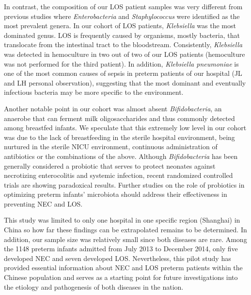 \documentclass[fleqn,10pt, lineno]{wlpeerj} %
\begin{document}
In contrast, the composition of our LOS patient samples was very different from previous studies where \textit{Enterobacteria} and \textit{Staphylococcus}  were identified as the most prevalent genera\citep{Stewart2017Longitudinal, mai2013distortions}. In our cohort of LOS patients, \textit{Klebsiella} was the most dominated genus.  LOS is frequently caused by organisms, mostly bacteria, that translocate from the intestinal tract to the bloodstream.  Consistently, \textit{Klebsiella} was detected in hemoculture in two out of two of our LOS patients (hemoculture was not performed for the third patient). In addition, \textit{Klebsiella pneumoniae} is one of the most common causes of sepsis in preterm patients of our hospital (JL and LH personal observation), suggesting that the most dominant and eventually infectious bacteria may be more specific to the environment.

Another notable point in our cohort was almost absent \textit{Bifidobacteria}, an anaerobe that can ferment milk oligosaccharides\citep{gomez2016human} and thus commonly detected among breastfed infants\citep{murphy2017composition}. We speculate that this extremely low level in our cohort was due to the lack of breastfeeding in the sterile hospital environment, being nurtured in the sterile NICU environment, continuous administration of antibiotics or the combinations of the above. Although \textit{Bifidobacteria} has been generally considered a probiotic that serves to protect neonates against necrotizing enterocolitis and systemic infection\citep{nakayama2003intestinal, khodayar2014impact, hermansson2019breast}, recent randomized controlled trials are showing paradoxical results\citep{hays2016probiotics, singh2019probiotics}. Further studies on the role of probiotics in optimizing preterm infants’ microbiota should address their effectiveness in preventing NEC and LOS.

This study was limited to only one hospital in one specific region (Shanghai)  in China so how far these findings can be extrapolated remains to be determined. In addition, our sample size was relatively small since both diseases are rare\citep{neu2011necrotizing, cohen2009early}. Among the 1148 preterm infants admitted from July 2013 to December 2014, only five developed NEC and seven developed LOS. Nevertheless, this pilot study has provided essential information about NEC and LOS preterm patients within the Chinese population and serves as a starting point for future investigations into the etiology and pathogenesis of both diseases in the nation.
\end{document}
